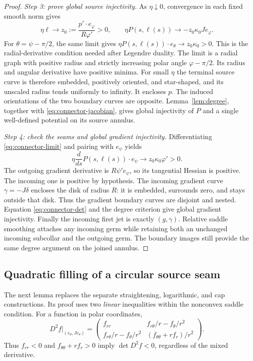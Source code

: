 \documentclass[11pt]{amsart}
\theoremstyle{definition}
\theoremstyle{remark}
\numberwithin{equation}{section}
\begin{document}
\begin{proof}
\emph{Step 3: prove global source injectivity.}
As $\eta\downarrow0$, convergence in each fixed smooth norm gives
\begin{equation}\label{eq:connector-limit}
 \eta\ell\longrightarrow z_0:=\frac{p'\cdot e_\varphi}{R\varphi'}>0,
 \qquad \eta P(s,\ell(s))\longrightarrow-z_0\kappa_0Je_\varphi.
\end{equation}
For $\theta=\psi-\pi/2$, the same limit gives
$\eta P(s,\ell(s))\cdot e_\theta\longrightarrow
z_0\kappa_0>0$. This is the radial-derivative condition needed after
Legendre duality. The limit is a radial graph with positive radius and
strictly increasing polar angle $\varphi-\pi/2$. Its radius and angular derivative have
positive minima. For small $\eta$ the terminal source curve is therefore
embedded, positively oriented, and star-shaped, and its unscaled radius
tends uniformly to infinity. It encloses $p$. The induced orientations
of the two boundary curves are opposite. Lemma~\ref{lem:degree}, together
with \eqref{eq:connector-jacobian}, gives global injectivity of $P$ and a
single well-defined potential on its source annulus.

\emph{Step 4: check the seams and global gradient injectivity.}
Differentiating \eqref{eq:connector-limit} and pairing with $e_\psi$ yields
\[
 \eta\frac d{ds}P(s,\ell(s))\cdot e_\psi
 \longrightarrow z_0\kappa_0\varphi'>0.
\]
The outgoing gradient derivative is $R\psi'e_\psi$, so its tangential
Hessian is positive. The incoming one is positive by hypothesis.
The incoming gradient curve $\gamma=-J\delta$ encloses the disk of
radius $R$: it is embedded, surrounds zero, and stays outside that disk.
Thus the gradient boundary curves are disjoint and nested. Equation
\eqref{eq:connector-det} and the degree criterion give global gradient
injectivity. Finally the incoming first jet is exactly $(g,\gamma)$.
Relative saddle smoothing attaches any incoming germ while retaining
both an unchanged incoming subcollar and the outgoing germ. The boundary
images still provide the same degree argument on the joined annulus.
\end{proof}


\subsection{Quadratic filling of a circular source seam}
The next lemma replaces the separate straightening, logarithmic, and cap
constructions. Its proof uses two \emph{linear} inequalities within the
nonconvex saddle condition. For a function in polar coordinates,
\begin{equation}\label{eq:polar-hessian}
 D^2 f\big|_{(e_\theta,Je_\theta)}=
 \begin{pmatrix}
 f_{rr}& f_{r\theta}/r-f_\theta/r^2\\
 f_{r\theta}/r-f_\theta/r^2&(f_{\theta\theta}+rf_r)/r^2
 \end{pmatrix}.
\end{equation}
Thus $f_{rr}<0$ and $f_{\theta\theta}+rf_r>0$ imply
$\det D^2f<0$, regardless of the mixed derivative.
\end{document}
